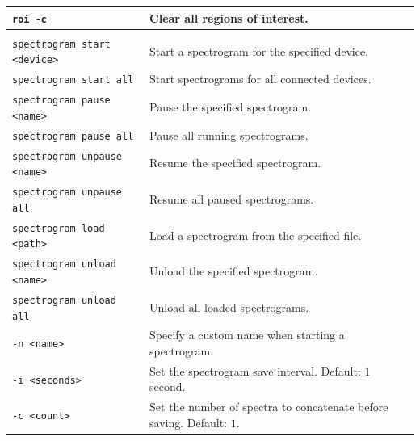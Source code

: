\begin{longtable}{>{\ttfamily}p{} p{}}
    \texttt{roi -c} &
        Clear all regions of interest. \\

    \hline


    \multicolumn{2}{l}{\textbf{Spectrogram Management}} \\

    \texttt{spectrogram start <device>} &
        Start a spectrogram for the specified device. \\

    \texttt{spectrogram start all} &
        Start spectrograms for all connected devices. \\

    \texttt{spectrogram pause <name>} &
        Pause the specified spectrogram. \\

    \texttt{spectrogram pause all} &
        Pause all running spectrograms. \\

    \texttt{spectrogram unpause <name>} &
        Resume the specified spectrogram. \\

    \texttt{spectrogram unpause all} &
        Resume all paused spectrograms. \\

    \texttt{spectrogram load <path>} &
        Load a spectrogram from the specified file. \\

    \texttt{spectrogram unload <name>} &
        Unload the specified spectrogram. \\

    \texttt{spectrogram unload all} &
        Unload all loaded spectrograms. \\

    \texttt{-n <name>} &
        Specify a custom name when starting a spectrogram. \\

    \texttt{-i <seconds>} &
        Set the spectrogram save interval. Default: $1$ second. \\

    \texttt{-c <count>} &
        Set the number of spectra to concatenate before saving.
        Default: $1$. \\

    \hline


\end{longtable}
